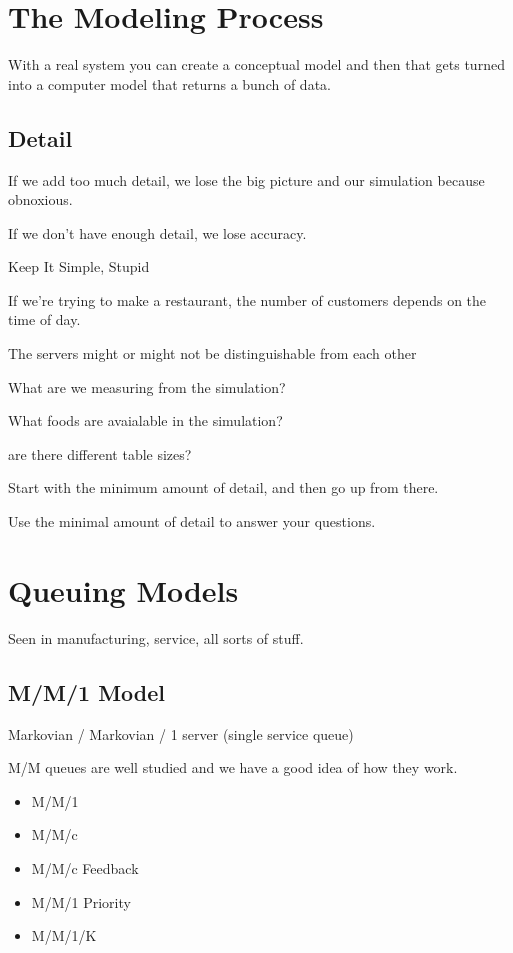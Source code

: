 \documentclass[fleqn]{report}
\begin{document}
\section{The Modeling Process}

With a real system you can create a conceptual model and then that gets 
 turned into a computer model that returns a bunch of data. 

 \subsection{Detail}

 If we add too much detail, we lose the big picture 
 and our simulation because obnoxious. 

 If we don't have enough detail, we lose accuracy. 

 Keep It Simple, Stupid

 If we're trying to make a restaurant, the number of customers 
 depends on the time of day. 

 The servers might or might not be distinguishable from each other 

 What are we measuring from the simulation?

 What foods are avaialable in the simulation?

 are there different table sizes?

 Start with the minimum amount of detail, and then go up from there. 

 Use the minimal amount of detail to answer your questions. 

 \section{Queuing Models}

 Seen in manufacturing, service, all sorts of stuff. 

 \subsection{M/M/1 Model}
 Markovian / Markovian / 1 server (single service queue)

 M/M queues are well studied and we have a good idea of how they work. 

\begin{itemize}
    \item
    M/M/1
    \item 
    M/M/c 
    \item 
    M/M/c Feedback 
    \item 
    M/M/1 Priority 
    \item 
    M/M/1/K
\end{itemize}
\end{document}
